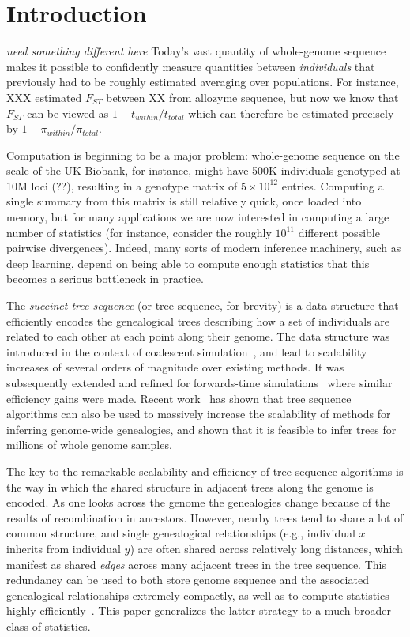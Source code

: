 \documentclass{article}
\newcommand{\plr}[1]{{\color{blue} \it #1}}
\begin{document}
\section*{Introduction}

\plr{need something different here}
Today's vast quantity of whole-genome sequence
makes it possible to confidently measure quantities
between \emph{individuals} that previously had to be roughly estimated
averaging over populations.
For instance, XXX estimated $F_{ST}$ between XX from allozyme sequence,
but now we know that $F_{ST}$ can be viewed as $1 - t_{within}/t_{total}$ \citep{slatkin_fst}
which can therefore be estimated precisely by $1 - \pi_{within}/\pi_{total}$.

Computation is beginning to be a major problem:
whole-genome sequence on the scale of the UK Biobank,
for instance, might have 500K individuals genotyped at 10M loci (??),
resulting in a genotype matrix of $5 \times 10^{12}$ entries.
Computing a single summary from this matrix is still relatively quick,
once loaded into memory,
but for many applications we are now interested in computing a large number of statistics
(for instance, consider the roughly $10^{11}$ different possible pairwise divergences).
Indeed, many sorts of modern inference machinery, such as deep learning,
depend on being able to compute enough statistics that this becomes a serious bottleneck in practice.

The \emph{succinct tree sequence} (or tree sequence, for brevity) is a data
structure that efficiently encodes the genealogical trees describing how a set of
individuals are related to each other at each point along their genome. The
data structure was introduced in the context of coalescent
simulation~\citep{kelleher2016efficient}, and lead to scalability increases of
several orders of magnitude over existing methods. It was subsequently extended
and refined for forwards-time simulations~\citep{kelleher2018efficient,haller2018tree}
where similar efficiency gains were made. Recent
work~\citep{kelleher2018inferring} has shown that tree sequence algorithms can
also be used to massively increase the scalability of methods for inferring
genome-wide genealogies, and shown that it is feasible to infer trees for
millions of whole genome samples.

The key to the remarkable scalability and efficiency of tree sequence
algorithms is the way in which the shared structure in adjacent trees along
the genome is encoded. As one looks across the genome the genealogies change
because of the results of recombination in ancestors.
However, nearby trees tend to share a lot of common structure,
and single genealogical relationships (e.g., individual $x$ inherits from individual $y$)
are often shared across relatively long distances,
which manifest as shared \emph{edges} across many adjacent trees in the tree sequence.
This redundancy can be used
to both store genome sequence and the associated genealogical relationships extremely compactly,
as well as to compute statistics highly efficiently~\citet{kelleher2016efficient}.
This paper generalizes the latter strategy to a much broader class of statistics.
\end{document}
